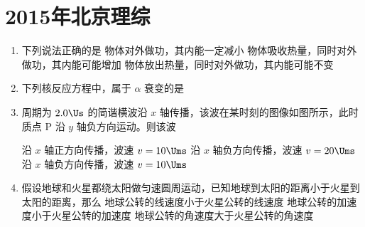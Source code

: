 \documentclass[\gkver]{gaokaozhenti}
\begin{document}
\chapter{2015年北京理综}

\begin{enumerate}
\item
下列说法正确的是
{物体对外做功，其内能一定减小}
{物体吸收热量，同时对外做功，其内能可能增加}
{物体放出热量，同时对外做功，其内能可能不变}

\item
下列核反应方程中，属于 $\alpha$ 衰变的是
{}
{}
{}

\item
周期为 $2.0\Us$ 的简谐横波沿 $x$ 轴传播，该波在某时刻的图像如图所示，此时质点 P 沿 $y$ 轴负方向运动。则该波


{沿 $x$ 轴正方向传播，波速 $v=10\Ums$}
{沿 $x$ 轴负方向传播，波速 $v=20\Ums$}
{沿 $x$ 轴负方向传播，波速 $v=10\Ums$}

\item
假设地球和火星都绕太阳做匀速圆周运动，已知地球到太阳的距离小于火星到太阳的距离，那么
{地球公转的线速度小于火星公转的线速度}
{地球公转的加速度小于火星公转的加速度}
{地球公转的角速度大于火星公转的角速度}


\end{enumerate}
\end{document}

